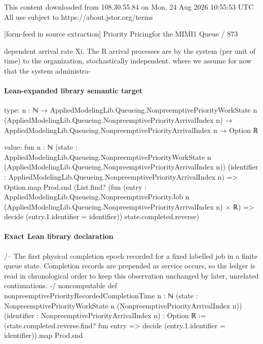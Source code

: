 \documentclass[10pt]{article}
\begin{document}
\begin{ReviewVerbatim}
                                                 This content downloaded from
                               108.30.55.84 on Mon, 24 Aug 2026 10:55:53 UTC
                                         All use subject to https://about.jstor.org/terms

[form-feed in source extraction]
                                                                                Priority Pricingfor the MIMI1 Queue / 873

dependent arrival rate Xi. The R arrival processes are                 by the system (per unit of time) to the organization,
stochastically independent.                                            where we assume for now that the system administra-
\end{ReviewVerbatim}



\paragraph{Lean-expanded library semantic target}
\begin{ReviewVerbatim}
type:
{n : ℕ} →
  AppliedModelingLib.Queueing.NonpreemptivePriorityWorkState n
      (AppliedModelingLib.Queueing.NonpreemptivePriorityArrivalIndex n) →
    AppliedModelingLib.Queueing.NonpreemptivePriorityArrivalIndex n → Option ℝ

value:
fun {n : ℕ}
    (state :
      AppliedModelingLib.Queueing.NonpreemptivePriorityWorkState n
        (AppliedModelingLib.Queueing.NonpreemptivePriorityArrivalIndex n))
    (identifier : AppliedModelingLib.Queueing.NonpreemptivePriorityArrivalIndex n) =>
  Option.map Prod.snd
    (List.find?
      (fun
          (entry :
            AppliedModelingLib.Queueing.NonpreemptivePriorityJob n
                (AppliedModelingLib.Queueing.NonpreemptivePriorityArrivalIndex n) ×
              ℝ) =>
        decide (entry.1.identifier = identifier))
      state.completed.reverse)
\end{ReviewVerbatim}

\paragraph{Exact Lean library declaration}
\begin{ReviewVerbatim}
/-- The first physical completion epoch recorded for a fixed labelled job in
a finite queue state.  Completion records are prepended as service occurs, so
the ledger is read in chronological order to keep this observation unchanged
by later, unrelated continuations. -/
noncomputable def nonpreemptivePriorityRecordedCompletionTime
    {n : ℕ}
    (state : NonpreemptivePriorityWorkState n (NonpreemptivePriorityArrivalIndex n))
    (identifier : NonpreemptivePriorityArrivalIndex n) : Option ℝ :=
  (state.completed.reverse.find? fun entry => decide (entry.1.identifier = identifier)).map Prod.snd
\end{ReviewVerbatim}
\end{document}
